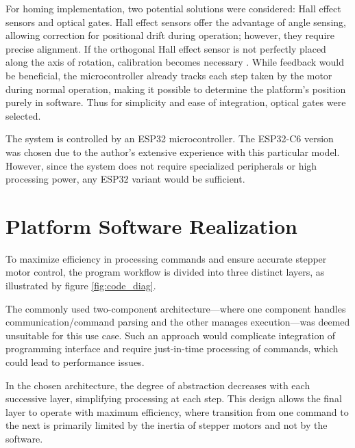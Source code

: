 For homing implementation, two potential solutions were considered: Hall effect sensors and optical gates.
Hall effect sensors offer the advantage of angle sensing, allowing correction for positional drift during operation; however, they require precise alignment.
If the orthogonal Hall effect sensor is not perfectly placed along the axis of rotation, calibration becomes necessary \cite{hall}.
While feedback would be beneficial, the microcontroller already tracks each step taken by the motor during normal operation, making it possible to determine the platform's position purely in software.
Thus for simplicity and ease of integration, optical gates were selected.

The system is controlled by an ESP32 microcontroller.
The ESP32-C6 version was chosen due to the author's extensive experience with this particular model.
However, since the system does not require specialized peripherals or high processing power, any ESP32 variant would be sufficient.

\section{Platform Software Realization}

To maximize efficiency in processing commands and ensure accurate stepper motor control, the program workflow is divided into three distinct layers, as illustrated by figure \ref{fig:code_diag}.

The commonly used two-component architecture—where one component handles communication/command parsing and the other manages execution—was deemed unsuitable for this use case.
Such an approach would complicate integration of programming interface and require just-in-time processing of commands, which could lead to performance issues.

In the chosen architecture, the degree of abstraction decreases with each successive layer, simplifying processing at each step.
This design allows the final layer to operate with maximum efficiency, where transition from one command to the next is primarily limited by the inertia of stepper motors and not by the software.


